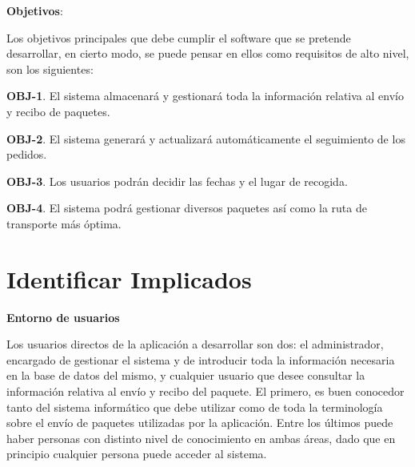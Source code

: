 \documentclass[a4paper, 11pt]{article}
\begin{document}
\setlength{\parindent}{1pt}
\textbf{Objetivos}:
\setlength{\parindent}{12pt}

Los objetivos principales que debe cumplir el software que se pretende desarrollar, en cierto modo, se puede pensar en ellos como requisitos de alto nivel, son los siguientes:

\setlength{\parindent}{30pt}
\textbf{OBJ-1}. El sistema almacenar\'a y gestionar\'a toda la informaci\'on relativa al env\'io y recibo de paquetes.

\textbf{OBJ-2}. El sistema generar\'a y actualizar\'a autom\'aticamente el seguimiento de los pedidos.

\textbf{OBJ-3}. Los usuarios podr\'an decidir las fechas y el lugar de recogida.

\textbf{OBJ-4}. El sistema podr\'a gestionar diversos paquetes as\'i como la ruta de transporte m\'as \'optima.

\setlength{\parindent}{1pt}
\section{Identificar Implicados}
\textbf{Entorno de usuarios}
\setlength{\parindent}{15pt}

Los usuarios directos de la aplicaci\'on a desarrollar son dos: el administrador, encargado de gestionar el sistema y de introducir toda la informaci\'on necesaria en la base de datos del mismo, y cualquier usuario que desee consultar la informaci\'on relativa al env\'io y recibo del paquete. El primero, es buen conocedor tanto del sistema inform\'atico que debe utilizar como de toda la terminolog\'ia sobre el env\'io de paquetes utilizadas por la aplicaci\'on. Entre los \'ultimos puede haber personas con distinto nivel de conocimiento en ambas \'areas, dado que en principio cualquier persona puede acceder al sistema.\\
\setlength{\parindent}{1pt}
\end{document}
